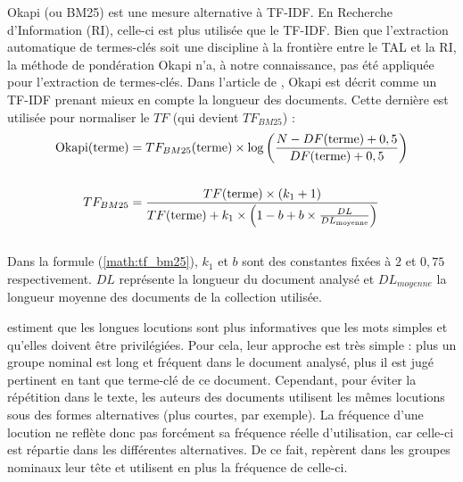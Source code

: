         Okapi (ou BM25) \citep{robertson1999okapi} est une mesure alternative à
        TF-IDF. En Recherche d'Information (RI), celle-ci est plus utilisée que le
        TF-IDF. Bien que l'extraction automatique de termes-clés soit une
        discipline à la frontière entre le TAL et la RI, la méthode de pondération
        Okapi n'a, à notre connaissance, pas été appliquée pour l'extraction de
        termes-clés. Dans l'article de \citet{claveau2012vectorisation}, Okapi est
        décrit comme un TF-IDF prenant mieux en compte la longueur des documents.
        Cette dernière est utilisée pour normaliser le $TF$ (qui devient
        $TF_{BM25}$) :
        \begin{align}
          \text{Okapi}(\text{terme}) &= TF_{BM25}(\text{terme}) \times \log\left(\frac{N - DF(\text{terme}) + 0,5}{DF(\text{terme}) + 0,5}\right) \label{math:okapi}\\
          \notag\\
          TF_{BM25} &= \frac{TF(\text{terme}) \times (k_1 + 1)}{TF(\text{terme}) + k_1 \times \left(1 - b + b \times \frac{DL}{DL_{\text{moyenne}}}\right)} \label{math:tf_bm25}
        \end{align}\\
        Dans la formule (\ref{math:tf_bm25}), $k_1$ et $b$ sont des constantes
        fixées à $2$ et $0,75$ respectivement. $DL$ représente la longueur du
        document analysé et $DL_{moyenne}$ la longueur moyenne des documents de la
        collection utilisée.

        \citet{barker2000nounphrasehead} estiment que les longues locutions sont
        plus informatives que les mots simples et qu'elles doivent être privilégiées.
        Pour cela, leur approche est très simple : plus un groupe nominal est long
        et fréquent dans le document analysé, plus il est jugé pertinent en tant
        que terme-clé de ce document. Cependant, pour éviter la répétition dans le
        texte, les auteurs des documents utilisent les mêmes locutions sous des
        formes alternatives (plus courtes, par exemple). La fréquence d'une locution
        ne reflète donc pas forcément sa fréquence réelle
        d'utilisation, car celle-ci est répartie dans les différentes
        alternatives. De ce fait, \citet{barker2000nounphrasehead} repèrent dans
        les groupes nominaux leur tête et utilisent en plus la fréquence de
        celle-ci.


